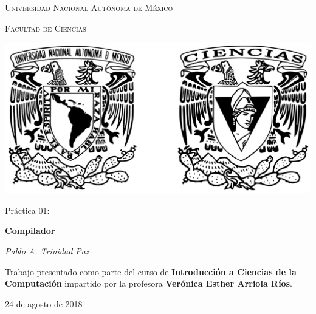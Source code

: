 \documentclass[11pt,letterpaper]{article}
\begin{document}
\begin{titlepage}
    \centering

    {\scshape\LARGE Universidad Nacional Autónoma de México \par}

    \vspace{1cm}
    {\scshape\Large Facultad de Ciencias\par}
    \vspace{1.5cm}

    \begin{center}
        \includegraphics[scale=.1]{../../assets/img/logo.png}
    \end{center}

    \vspace{.8 cm}

    {\LARGE Práctica 01: \par}
    {\huge\bfseries Compilador \par}

    \vspace{0.5cm}
    {\large\itshape Pablo A. Trinidad Paz\par}

    \vfill

    Trabajo presentado como parte del curso de \textbf{Introducción a Ciencias de la Computación}
    impartido por la profesora \textbf{Verónica Esther Arriola Ríos}. \par
    \vspace{0.1cm}
    {\large 24 de agosto de 2018\par}
\end{titlepage}
\end{document}
